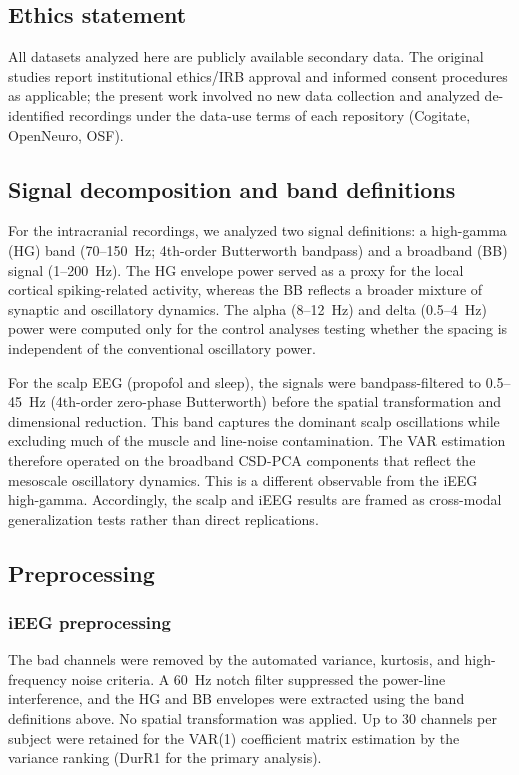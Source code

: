 \documentclass[preprint,12pt,nonatbib]{elsarticle}
\begin{document}
\subsection{Ethics statement}
All datasets analyzed here are publicly available secondary data. The original studies report institutional ethics/IRB approval and informed consent procedures as applicable; the present work involved no new data collection and analyzed de-identified recordings under the data-use terms of each repository (Cogitate, OpenNeuro, OSF).

\subsection{Signal decomposition and band definitions}

For the intracranial recordings, we analyzed two signal definitions: a high-gamma (HG) band (70--150~Hz; 4th-order Butterworth bandpass) and a broadband (BB) signal (1--200~Hz). The HG envelope power served as a proxy for the local cortical spiking-related activity, whereas the BB reflects a broader mixture of synaptic and oscillatory dynamics. The alpha (8--12~Hz) and delta (0.5--4~Hz) power were computed only for the control analyses testing whether the spacing is independent of the conventional oscillatory power.

For the scalp EEG (propofol and sleep), the signals were bandpass-filtered to 0.5--45~Hz (4th-order zero-phase Butterworth) before the spatial transformation and dimensional reduction. This band captures the dominant scalp oscillations while excluding much of the muscle and line-noise contamination. The VAR estimation therefore operated on the broadband CSD-PCA components that reflect the mesoscale oscillatory dynamics. This is a different observable from the iEEG high-gamma. Accordingly, the scalp and iEEG results are framed as cross-modal generalization tests rather than direct replications.

\subsection{Preprocessing}

\subsubsection{iEEG preprocessing}
The bad channels were removed by the automated variance, kurtosis, and high-frequency noise criteria. A 60~Hz notch filter suppressed the power-line interference, and the HG and BB envelopes were extracted using the band definitions above. No spatial transformation was applied. Up to 30 channels per subject were retained for the VAR(1) coefficient matrix estimation by the variance ranking (DurR1 for the primary analysis).
\end{document}
